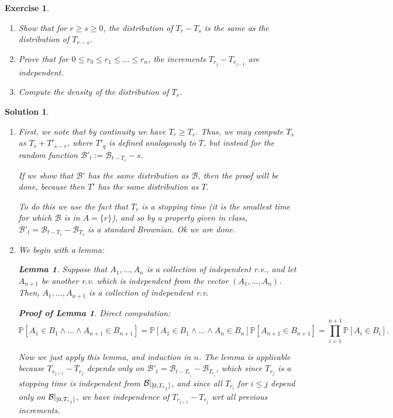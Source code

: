 \documentclass{article}
\newtheorem{lemma}{Lemma}
\newtheorem{ex}{Exercise}
\theoremstyle{nonumberplain}
\newtheorem{sol}{Solution}
\newtheorem{lemmaproof}{Proof of Lemma}
\newcommand{\PP}{\mathbb{P}}
\newcommand{\Brwn}{\mathcal{B}}
\begin{document}
\begin{ex}
\leavevmode
\begin{enumerate}
\item Show that for $r \geq s \geq 0$, the distribution of $T_r - T_s$ is the same as the distribution of $T_{r-s}$.
\item Prove that for $0 \leq r_0 \leq r_1 \leq \dots \leq r_n$, the increments $T_{r_j} - T_{r_{j-1}}$ are independent.
\item Compute the density of the distribution of $T_r$.
\end{enumerate}
\end{ex}

\begin{sol}
\leavevmode
\begin{enumerate}
\item First, we note that by continuity we have $T_r \geq T_s$. Thus, we may compute $T_s$ as $T_r + T'_{s-r}$, where $T'_q$ is defined analogously to $T$, but instead for the random function $\Brwn'_t := \Brwn_{t-T_s} - s$.

If we show that $\Brwn'$ has the same distribution as $\Brwn$, then the proof will be done, because then $T'$ has the same distribution as $T$.

To do this we use the fact that $T_r$ is a stopping time (it is the smallest time for which $\Brwn$ is in $A = \{r\}$), and so by a property given in class, $\Brwn'_t = \Brwn_{t-T_s} - \Brwn_{T_s}$ is a standard Brownian. Ok we are done.

\item We begin with a lemma:
\begin{lemma}
Suppose that $A_1, \dots, A_n$ is a collection of independent r.v., and let $A_{n+1}$ be another r.v. which is independent from the vector $(A_1, \dots, A_n)$. Then, $A_1,\dots,A_{n+1}$ is a collection of independent r.v.
\end{lemma}
\begin{lemmaproof}
Direct computation:
\begin{equation}
\PP[A_1 \in B_1 \land \dots \land A_{n+1} \in B_{n+1}] = \PP[A_1 \in B_1 \land \dots \land A_n \in B_n] \PP[A_{n+1} \in B_{n+1}] = \prod_{i=1}^{n+1} \PP[A_i \in B_i].
\end{equation}
\NoEndMark
\hfill\lemmaproofSymbol
\end{lemmaproof}

Now we just apply this lemma, and induction in $n$. The lemma is applicable because $T_{r_{j+1}} - T_{r_{j}}$ depends only on $\Brwn'_t = \Brwn_{t - T_{r_{j}}} - \Brwn_{T_{r_j}}$, which since $T_{r_j}$ is a stopping time is independent from $\Brwn|_{\interval0{T_{r_j}}}$, and since all $T_{r_i}$ for $i \leq j$ depend only on $\Brwn|_{\interval0{T_{r_j}}}$, we have independence of $T_{r_{j+1}} - T_{r_j}$ wrt all previous increments.


\end{enumerate}
\end{sol}
\end{document}
